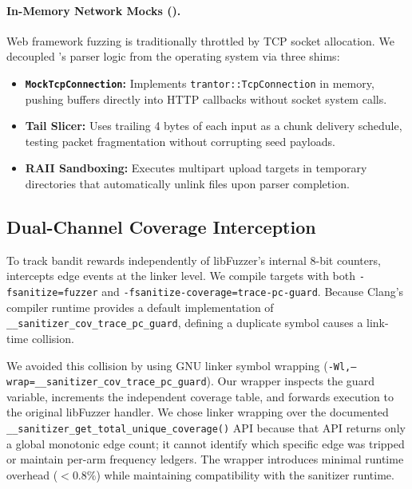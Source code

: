 \paragraph{In-Memory Network Mocks (\drogon).}
Web framework fuzzing is traditionally throttled by TCP socket allocation.
We decoupled \drogon's parser logic from the operating system via three shims:
\begin{itemize}
  \item \textbf{\texttt{MockTcpConnection}:} Implements \texttt{trantor::TcpConnection} in memory, pushing buffers directly into HTTP callbacks without socket system calls.
  \item \textbf{Tail Slicer:} Uses trailing 4 bytes of each input as a chunk delivery schedule, testing packet fragmentation without corrupting seed payloads.
  \item \textbf{RAII Sandboxing:} Executes multipart upload targets in temporary directories that automatically unlink files upon parser completion.
\end{itemize}

\subsection{Dual-Channel Coverage Interception}
\label{sec:linker_wrapping}
To track bandit rewards independently of libFuzzer's internal 8-bit counters, \tool intercepts edge events at the linker level.
We compile targets with both \texttt{-fsanitize=fuzzer} and \texttt{-fsanitize-coverage=trace-pc-guard}.
Because Clang's compiler runtime provides a default implementation of \texttt{\_\_sanitizer\_cov\_trace\_pc\_guard}, defining a duplicate symbol causes a link-time collision.

We avoided this collision by using GNU linker symbol wrapping (\texttt{-Wl,}\allowbreak\texttt{--wrap=}\allowbreak\texttt{\_\_sanitizer\_}\allowbreak\texttt{cov\_}\allowbreak\texttt{trace\_}\allowbreak\texttt{pc\_}\allowbreak\texttt{guard}).
Our wrapper inspects the guard variable, increments the independent coverage table, and forwards execution to the original libFuzzer handler.
We chose linker wrapping over the documented \texttt{\_\_sanitizer\_get\_total\_unique\_coverage()} API because that API returns only a global monotonic edge count; it cannot identify which specific edge was tripped or maintain per-arm frequency ledgers.
The wrapper introduces minimal runtime overhead ($<0.8\%$) while maintaining compatibility with the sanitizer runtime.
